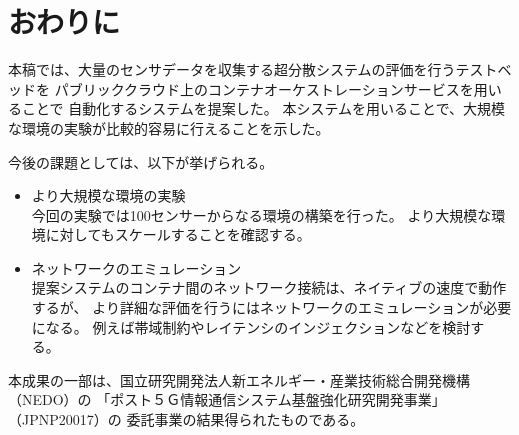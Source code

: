 \documentclass[submit,techrep]{ipsj}
\begin{document}

\section{おわりに}\label{sec:conclusion}
本稿では、大量のセンサデータを収集する超分散システムの評価を行うテストベッドを
パブリッククラウド上のコンテナオーケストレーションサービスを用いることで
自動化するシステムを提案した。
本システムを用いることで、大規模な環境の実験が比較的容易に行えることを示した。

今後の課題としては、以下が挙げられる。
\begin{itemize}
  \item より大規模な環境の実験\\
  今回の実験では100センサーからなる環境の構築を行った。
  より大規模な環境に対してもスケールすることを確認する。
  
  \item ネットワークのエミュレーション\\
  提案システムのコンテナ間のネットワーク接続は、ネイティブの速度で動作するが、
  より詳細な評価を行うにはネットワークのエミュレーションが必要になる。
  例えば帯域制約やレイテンシのインジェクションなどを検討する。

\end{itemize}

\begin{acknowledgment}
本成果の一部は、国立研究開発法人新エネルギー・産業技術総合開発機構（NEDO）の
「ポスト５Ｇ情報通信システム基盤強化研究開発事業」（JPNP20017）の
委託事業の結果得られたものである。
\end{acknowledgment}



\end{document}
